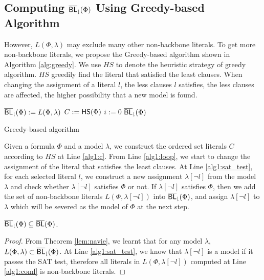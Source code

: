 \medskip

\subsection{Computing ${\sf \overline{BL}_\downharpoonright}(\Phi)$ Using Greedy-based Algorithm}

However, $L(\Phi,\lambda)$ may exclude many other non-backbone literals.
To get more non-backbone literals, we propose the Greedy-based algorithm shown in Algorithm \ref{alg:greedy}. We use $HS$ to denote the heuristic strategy of greedy algorithm. $HS$ greedily find the literal that satisfied the least clauses. When changing the assignment of a literal $l$, the less clauses $l$ satisfies, the less clauses are affected, the higher possibility that a new model is found.

\begin{algorithm2e}
\SetAlgoShortEnd
\SetFillComment
{}
${\sf \overline{BL}_\downharpoonright}(\Phi):=L(\Phi,\lambda)$\; \label{alg1:init}
$C:={\sf HS}(\Phi)$\; \label{alg1:c}
$i:=0$\;
\Return ${\sf \overline{BL}_\downharpoonright}(\Phi)$\;
\caption{Greedy-based algorithm}
\label{alg:greedy}
\end{algorithm2e}
Given a formula $\Phi$ and a model $\lambda$, we construct the ordered set literals $C$ according to $HS$ at Line \ref{alg1:c}. From Line \ref{alg1:loop}, we start to change the assignment of the literal that satisfies the least clauses. At Line \ref{alg1:sat_test}, for each selected literal $l$, we construct a new assignment $\lambda[\neg l]$ from the model
$\lambda$ and check whether  $\lambda[\neg l]$ satisfies $\Phi$ or not. If $\lambda[\neg l]$ satisfies $\Phi$, then we add the set of non-backbone literals $L(\Phi,\lambda[\neg l])$ into ${\sf \overline{BL}_\downharpoonright}(\Phi)$, and
assign $\lambda[\neg l]$ to $\lambda$ which will be severed as the model of $\Phi$ at the next step.

\begin{theorem}
${\sf \overline{BL}_\downharpoonright}(\Phi)\subseteq\overline{\textsf{BL}}(\Phi)$.
\end{theorem}

\begin{proof}
From Theorem \ref{lem:navie}, we learnt that for any model $\lambda$, $L(\Phi,\lambda)\subset{\sf \overline{BL}_\downharpoonright}(\Phi)$. At Line \ref{alg1:sat_test}, we know that $\lambda[\neg l]$ is a model if it passes the SAT test, therefore all literals in $L(\Phi,\lambda[\neg l])$ computed at Line \ref{alg1:coml} is non-backbone literals.
\end{proof}

